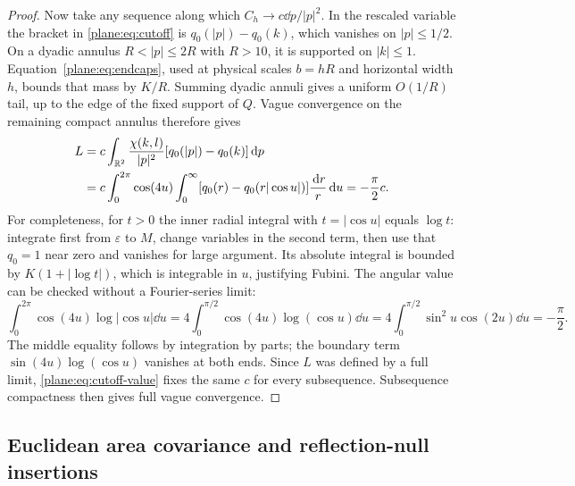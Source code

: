 \begin{proof}
Now take any sequence along which $C_h\to c\dd p/|p|^2$.
In the rescaled variable the bracket in \eqref{plane:eq:cutoff} is
$q_0(|p|)-q_0(k)$, which vanishes on $|p|\le1/2$.
On a dyadic annulus $R<|p|\le2R$ with $R>10$, it is supported on
$|k|\le1$.  Equation~\eqref{plane:eq:endcaps}, used at physical
scales $b=hR$ and horizontal width $h$, bounds that mass by $K/R$.
Summing dyadic annuli gives a uniform $O(1/R)$ tail, up to the edge
of the fixed support of $Q$.  Vague convergence on the remaining
compact annulus therefore gives
\begin{align}
 L&=c\int_{\mathbb R^2}\frac{\chi(k,l)}{|p|^2}
              [q_0(|p|)-q_0(k)]\,\mathrm d p \notag\\
  &=c\int_0^{2\pi}\cos(4u)
       \int_0^\infty[q_0(r)-q_0(r|\cos u|)]\frac{\,\mathrm d r}{r}\,\mathrm d u
    =-\frac\pi2c.                       \label{plane:eq:cutoff-value}
\end{align}
For completeness, for $t>0$ the inner radial integral with $t=|\cos u|$
equals $\log t$: integrate first from $\varepsilon$ to $M$, change
variables in the second term, then use that $q_0=1$ near zero and
vanishes for large argument.  Its absolute integral is bounded by
$K(1+|\log t|)$, which is integrable in $u$, justifying Fubini.
The angular value can be checked without a Fourier-series limit:
\[
 \int_0^{2\pi}\cos(4u)\log|\cos u|\dd u
 =4\int_0^{\pi/2}\cos(4u)\log(\cos u)\dd u
 =4\int_0^{\pi/2}\sin^2u\cos(2u)\dd u
 =-\frac\pi2.
\]
The middle equality follows by integration by parts; the boundary
term $\sin(4u)\log(\cos u)$ vanishes at both ends.
Since $L$ was defined by a full limit, \eqref{plane:eq:cutoff-value}
fixes the same $c$ for every subsequence.  Subsequence compactness
then gives full vague convergence.
\end{proof}

\subsection{Euclidean area covariance and reflection-null insertions}

